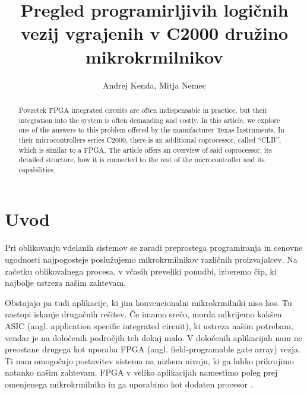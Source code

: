 \documentclass[a4paper]{article}
\begin{document}
\begin{sloppypar}
\title{Pregled programirljivih logičnih vezij vgrajenih v C2000 družino
       mikrokrmilnikov}

\author{Andrej Kenda, Mitja Nemec}
% 


\maketitle



\begin{abstract}{Povzetek}
FPGA integrated circuits are often indispensable in practice, but their
integration into the system is often demanding and costly. In this article, we
explore one of the answers to this problem offered by the manufacturer Texas
Instruments. In their microcontrollers series C2000, there is an additional
coprocessor, called ``CLB'', which is similar to a FPGA. The article offers an
overview of said coprocessor, its detailed structure, how it is connected to
the rest of the microcontroller and its capabilities.
\end{abstract}




\section{Uvod}
Pri oblikovanju vdelanih sistemov se zaradi preprostega programiranja in
cenovne ugodnosti najpogosteje poslužujemo mikrokrmilnikov različnih
proizvajalcev. Na začetku oblikovalnega procesa, v včasih preveliki ponudbi,
izberemo čip, ki najbolje ustreza našim zahtevam.

Obstajajo pa tudi aplikacije, ki jim konvencionalni mikrokrmilniki niso kos. Tu
nastopi iskanje drugačnih rešitev. Če imamo srečo, morda odkrijemo kakšen ASIC
(angl. application specific integrated circuit), ki ustreza našim potrebam,
vendar je na določenih področjih teh dokaj malo. V določenih aplikacijah nam ne
preostane drugega kot uporaba FPGA (angl. field-programable gate array) vezja.
Ti nam omogočajo postavitev sistema na nizkem nivoju, ki ga lahko prikrojimo
natanko našim zahtevam. FPGA v veliko aplikacijah namestimo poleg prej
omenjenega mikrokrmilnika in ga uporabimo kot dodaten procesor
\cite{chen-fpga-automation}.


\end{sloppypar}
\end{document}
